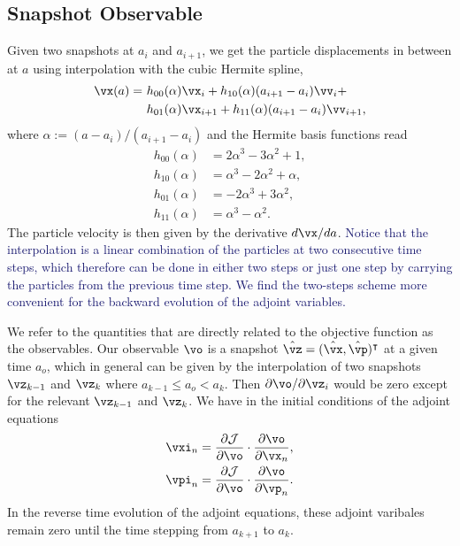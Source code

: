 \documentclass[modern, trackchanges, dvipsnames]{aastex631}
\renewcommand{\d}{d}
\newcommand{\p}{\partial}
\newcommand{\cJ}{\mathcal{J}}
\newcommand{\YZ}[1]{\textcolor{MidnightBlue}{#1}}
\begin{document}
\vspace{1em}
\subsection{Snapshot Observable}
\label{sec:snapobs}

Given two snapshots at $a_i$ and $a_{i+1}$, we get the particle displacements
in between at $a$ using interpolation with the cubic Hermite spline,
\begin{align}
  \vx(a) =\ &h_{00}(\alpha)\vx_i + h_{10}(\alpha)(a_{i+1} - a_i)\vv_i + \nonumber\\
           &h_{01}(\alpha)\vx_{i+1} + h_{11}(\alpha)(a_{i+1} - a_i)\vv_{i+1},
\end{align}
where $\alpha := (a - a_i)/(a_{i+1} - a_i)$ and the Hermite basis functions read
\begin{align}
  h_{00}(\alpha) &= 2\alpha^3 - 3\alpha^2 + 1, \nonumber\\
  h_{10}(\alpha) &= \alpha^3 - 2\alpha^2 + \alpha, \nonumber\\
  h_{01}(\alpha) &= -2\alpha^3 + 3\alpha^2, \nonumber\\
  h_{11}(\alpha) &= \alpha^3 - \alpha^2.
\end{align}
The particle velocity is then given by the derivative $\d\vx / \d a$.
\YZ{Notice that the interpolation is a linear combination of the particles at
two consecutive time steps, which therefore can be done in either two steps or
just one step by carrying the particles from the previous time step.
We find the two-steps scheme more convenient for the backward evolution of the
adjoint variables.}

We refer to the quantities that are directly related to the objective function
as the observables.
Our observable $\vo$ is a snapshot $\hat\vz = (\hat\vx,
\hat\vp)^\intercal$ at a given time $a_o$, which in general can be given by the
interpolation of two snapshots $\vz_{k-1}$ and $\vz_k$ where $a_{k-1} \leq a_o <
a_k$.
Then ${\p\vo}/{\p\vz_i}$ would be zero except for the relevant $\vz_{k-1}$
and $\vz_k$. We have in the initial conditions of the adjoint equations
\begin{align}
  \vxi_n &= \frac{\p\cJ}{\p\vo} \cdot \frac{\p\vo}{\p\vx_n}, \nonumber\\
  \vpi_n &= \frac{\p\cJ}{\p\vo} \cdot \frac{\p\vo}{\p\vp_n}.
\end{align}
In the reverse time evolution of the adjoint equations, these adjoint varibales
remain zero until the time stepping from $a_{k+1}$ to $a_k$.
\end{document}
